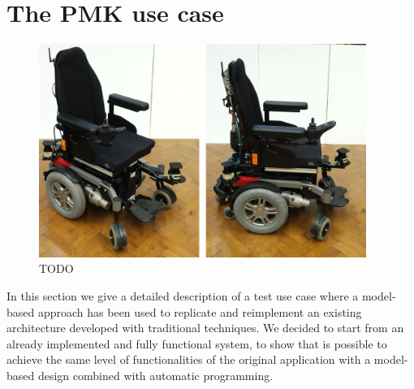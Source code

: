 
\chapter{The PMK use case}
\label{sec:pmk}

\begin{figure}[t]
\centering
\includegraphics[width=0.95\textwidth]{gfx/pmk/pmk_plat}
\caption{TODO}
\label{fig:pmk}
\end{figure}

In this section we give a detailed description of a test use case where a model-based approach has been used to replicate and reimplement an existing architecture developed with traditional techniques. We decided to start from an already implemented and fully functional system, to show that is possible to achieve the same level of functionalities of the original application with a model-based design combined with automatic programming.

